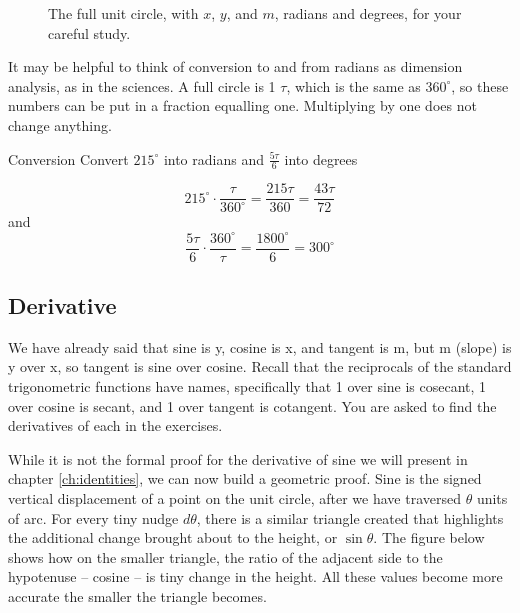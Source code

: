 \begin{figure}
\begin{center}
\caption{The full unit circle, with $x$, $y$, and $m$, radians and degrees, for your careful study.}
\end{center}
\end{figure}


It may be helpful to think of conversion to and from radians as dimension analysis,
as in the sciences.  A full circle is 1 $\tau$, which is the same as $360^\circ$, so these
numbers can be put in a fraction equalling one.  Multiplying by one does not change 
anything.

\begin{example}{Conversion}
\exProblem
Convert $215^\circ$ into radians and $\frac{5\tau}{6}$ into degrees

\exSolution
$$
215^\circ \cdot \frac{\tau}{360^\circ} = \frac{215\tau}{360} = \frac{43\tau}{72}
$$
and
$$
\frac{5\tau}{6} \cdot \frac{360^\circ}{\tau} = \frac{1800^\circ}{6} = 300^\circ
$$
\end{example}

\subsection{Derivative}
We have already said that sine is y, cosine is x, and tangent is m, but m (slope)
is y over x, so tangent is sine over cosine.  Recall that the reciprocals of the
standard trigonometric functions have names, specifically that 1 over sine
is cosecant, 1 over cosine is secant, and 1 over tangent is cotangent.  You are asked
to find the derivatives of each in the exercises.

While it is not the formal proof for the derivative of sine we will present in chapter
\ref{ch:identities}, we can now build a geometric proof.  Sine is the signed vertical
displacement of a point on the unit circle, after we have traversed $\theta$ units of
arc.  For every tiny nudge $d\theta$, there is a similar triangle created that
highlights the additional change brought about to the height, or $\sin\theta$.  The 
figure below shows how on the smaller triangle, the ratio of the adjacent side
to the hypotenuse -- cosine -- is tiny change in the height.  All these values
become more accurate the smaller the triangle becomes.

